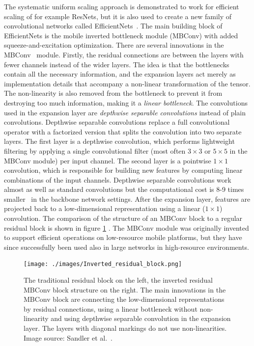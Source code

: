 \documentclass[english,twoside,openright]{HYgraduMLDS}
\begin{document}
The systematic uniform scaling approach is demonstrated to work for efficient scaling of for example ResNets, but it is also used to create a new family of convolutional networks called EfficientNets~\cite{EfficientNet}. The main building block of EfficientNets is the mobile inverted bottleneck module (MBConv) with added squeeze-and-excitation optimization. There are several innovations in the MBConv~\cite{MobileNetv2} module. Firstly, the residual connections are between the layers with fewer channels instead of the wider layers. The idea is that the bottlenecks contain all the necessary information, and the expansion layers act merely as implementation details that accompany a non-linear transformation of the tensor. The non-linearity is also removed from the bottleneck to prevent it from destroying too much information, making it a \textit{linear bottleneck}. The convolutions used in the expansion layer are \textit{depthwise separable convolutions} instead of plain convolutions. Depthwise separable convolutions replace a full convolutional operator with a factorized version that splits the convolution into two separate layers. The first layer is a depthwise
convolution, which performs lightweight filtering by applying a single convolutional filter (most often $3 \times 3$ or $5 \times 5$ in the MBConv module) per input channel. The second layer is a pointwise $1 \times 1$ convolution, which is responsible for building new features by computing linear combinations of the input channels. Depthwise separable convolutions work almost as well as standard convolutions but the computational cost is 8-9 times smaller~\cite{MobileNetv2} in the backbone network settings. After the expansion layer, features are projected back to a
low-dimensional representation using a linear ($1 \times 1$) convolution. The comparison of the structure of an MBConv block to a regular residual block is shown in figure \ref{fig:MBConv} . The MBConv module was originally invented to support efficient operations on low-resource mobile platforms, but they have since successfully been used also in large networks in high-resource environments.

\begin{figure}[h] 
\centering
\texttt{[image: ./images/Inverted\_residual\_block.png]}
\caption{The traditional residual block on the left, the inverted residual MBConv block structure on the right. The main innovations in the MBConv block are connecting the low-dimensional representations by residual connections, using a linear bottleneck without non-linearity and using depthwise separable convolution in the expansion layer. The layers with diagonal markings do not use non-linearities. Image source: Sandler et al.~\cite{MobileNetv2}.}
\label{fig:MBConv} 
\end{figure}
\end{document}

